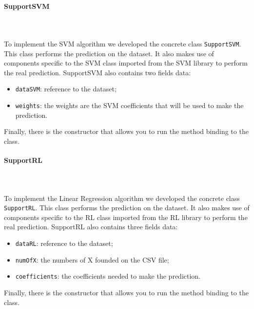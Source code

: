 \paragraph*{SupportSVM}\mbox{} \\ \mbox{} \\
To implement the SVM algorithm we developed the concrete class \texttt{SupportSVM}. This class performs the prediction on the dataset. 
It also makes use of components specific to the SVM class imported from the SVM library to perform the real prediction. SupportSVM also contains two fields data: \begin{itemize}
\item \texttt{dataSVM}: reference to the dataset;
\item \texttt{weights}: the weights are the SVM coefficients that will be used to make the prediction.
\end{itemize}
Finally, there is the constructor that allows you to run the method binding to the class.

\paragraph*{SupportRL}\mbox{} \\ \mbox{} \\
To implement the Linear Regression algorithm we developed the concrete class \texttt{SupportRL}. This class performs the prediction on the dataset. It also makes use of components specific to the RL class imported from the RL library to perform the real prediction. SupportRL also contains three fields data: \begin{itemize}
\item \texttt{dataRL}: reference to the dataset;
\item \texttt{numOfX}: the numbers of X founded on the CSV file;
\item \texttt{coefficients}: the coefficients needed to make the prediction.
\end{itemize}
Finally, there is the constructor that allows you to run the method binding to the class.

